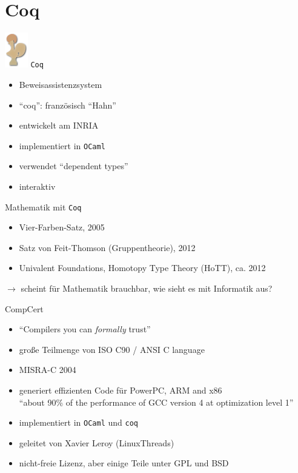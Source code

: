 \documentclass[aspectratio=169]{beamer}
\begin{document}
\section{Coq}
\begin{frame}
  \begin{center}
    \includegraphics[width=1.0cm]{coq_logo.png}
    \Large{\texttt{Coq}}
  \end{center}
  \begin{itemize}
  \item Beweisassistenzsystem
  \item ``coq'': französisch ``Hahn''
  \item entwickelt am INRIA
  \item implementiert in \texttt{OCaml}
  \item verwendet ``dependent types''
  \item interaktiv
  \end{itemize}
\end{frame}
\begin{frame}
  \begin{center}
    \Large{Mathematik mit \texttt{Coq}}
  \end{center}
  \begin{itemize}
  \item Vier-Farben-Satz, 2005
  \item Satz von Feit-Thomson (Gruppentheorie), 2012
  \item Univalent Foundations, Homotopy Type Theory (HoTT), ca. 2012
  \end{itemize}
  \pause
  \vfill
  $\rightarrow$ scheint für Mathematik brauchbar, wie sieht es mit Informatik aus?
\end{frame}
\begin{frame}
  \begin{center}
    \Large{CompCert}
  \end{center}
  \begin{itemize}
  \item ``Compilers you can \textit{formally} trust''
  \item große Teilmenge von ISO C90 / ANSI C language
  \item MISRA-C 2004
  \item generiert effizienten Code für PowerPC, ARM and x86\\
    ``about 90\% of the performance of GCC version 4 at optimization level 1''
  \item implementiert in \texttt{OCaml} und \texttt{coq}
  \item geleitet von Xavier Leroy (LinuxThreads) 
  \item nicht-freie Lizenz, aber einige Teile unter GPL und BSD
  \end{itemize}
\end{frame}
\end{document}
